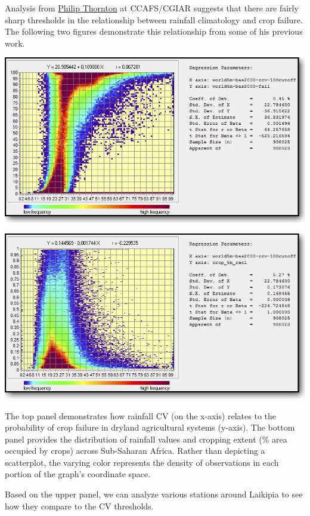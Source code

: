 \documentclass[11pt]{article}
\makeatletter
\def\maxwidth{\ifdim\Gin@nat@width>\linewidth\linewidth
    \else\Gin@nat@width\fi}
\let\Oldincludegraphics\includegraphics
\renewcommand{\includegraphics}[1]{\Oldincludegraphics[width=.8\maxwidth]{#1}}
\makeatother
\begin{document}
Analysis from
\href{https://ccafs.cgiar.org/about/people/philip-thornton\#.W4H37S2ZPOQ}{Philip
Thornton} at CCAFS/CGIAR suggests that there are fairly sharp thresholds
in the relationship between rainfall climatology and crop failure. The
following two figures demonstrate this relationship from some of his
previous work.

\href{../assets/crop_failure_vs_rainfall_cv.png}{\includegraphics{../assets/crop_failure_vs_rainfall_cv.png}}

\href{../assets/cropping_extent_vs_rainfall_cv.png}{\includegraphics{../assets/cropping_extent_vs_rainfall_cv.png}}

The top panel demonstrates how rainfall CV (on the x-axis) relates to
the probability of crop failure in dryland agricultural systems
(y-axis). The bottom panel provides the distribution of rainfall values
and cropping extent (\% area occupied by crops) across Sub-Saharan
Africa. Rather than depicting a scatterplot, the varying color
represents the density of observations in each portion of the graph's
coordinate space.

Based on the upper panel, we can analyze various stations around
Laikipia to see how they compare to the CV thresholds.
\end{document}
